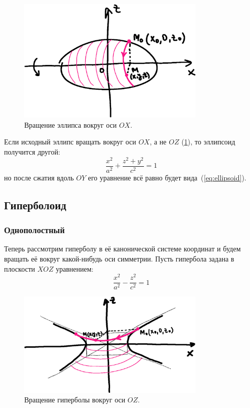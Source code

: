 \documentclass[a4paper,12pt]{article}
\begin{document}
  \begin{figure}[h]
    \centering

    \includegraphics[width=0.8\textwidth]{ellipse-rotate-2}
  
    \caption{Вращение эллипса вокруг оси $OX$.}
    \label{fig:ellipse-rotate-2}
  \end{figure}
  
  Если исходный эллипс вращать вокруг оси $OX$, а не $OZ$ (\ref{fig:ellipse-rotate-2}), то эллипсоид получится другой:
  \[
    \frac{x^2}{a^2} + \frac{z^2 + y^2}{c^2} = 1
  \]
  но после сжатия вдоль $OY$ его уравнение всё равно будет вида~(\ref{eq:ellipsoid}).
  
  
  \subsection{Гиперболоид}
  
  \subsubsection{Однополостный}
  
  Теперь рассмотрим гиперболу в её канонической системе координат и будем вращать её вокруг какой-нибудь оси симметрии.
  Пусть гипербола задана в плоскости $XOZ$ уравнением:
  \[
    \frac{x^2}{a^2} - \frac{z^2}{c^2} = 1
  \]
  
  \begin{figure}[h]
    \centering

    \includegraphics[width=0.8\textwidth]{hyperbola-rotate-1}
  
    \caption{Вращение гиперболы вокруг оси $OZ$.}
    \label{fig:hyperbola-rotate-1}
  \end{figure}
  
\end{document}
